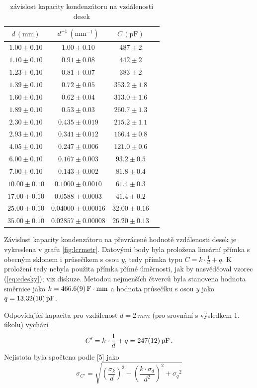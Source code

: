 \documentclass{../concepts/prepareprotokol} %
\begin{document}
\begin{table}[hbpt]
\centering
\caption{závislost kapacity kondenzátoru na vzdálenosti desek}
\begin{tabular}{cccc}
 \toprule
 $d\, (\mathrm{mm})$ & $d^{-1}\, (\mathrm{mm^{-1}})$ & $C\, (\mathrm{pF})$ \\
 \midrule
 $1.00 \pm 0.10$ & $1.00 \pm 0.10$ & $487 \pm 2$ \\
 $1.10 \pm 0.10$ & $0.91 \pm 0.08$ & $442 \pm 2$ \\
 $1.23 \pm 0.10$ & $0.81 \pm 0.07$ & $383 \pm 2$ \\
 $1.39 \pm 0.10$ & $0.72 \pm 0.05$ & $353.2 \pm 1.8$ \\
 $1.60 \pm 0.10$ & $0.62 \pm 0.04$ & $313.0 \pm 1.6$ \\
 $1.89 \pm 0.10$ & $0.53 \pm 0.03$ & $260.7 \pm 1.3$ \\
 $2.30 \pm 0.10$ & $0.435 \pm 0.019$ & $215.2 \pm 1.1$ \\
 $2.93 \pm 0.10$ & $0.341 \pm 0.012$ & $166.4 \pm 0.8$ \\
 $4.05 \pm 0.10$ & $0.247 \pm 0.006$ & $121.0 \pm 0.6$ \\
 $6.00 \pm 0.10$ & $0.167 \pm 0.003$ & $93.2 \pm 0.5$ \\
 $7.00 \pm 0.10$ & $0.143 \pm 0.002$ & $81.8 \pm 0.4$ \\
 $10.00 \pm 0.10$ & $0.1000 \pm 0.0010$ & $61.4 \pm 0.3$ \\
 $17.00 \pm 0.10$ & $0.0588 \pm 0.0003$ & $41.4 \pm 0.2$ \\
 $25.00 \pm 0.10$ & $0.04000 \pm 0.00016$ & $32.00 \pm 0.16$ \\
 $35.00 \pm 0.10$ & $0.02857 \pm 0.00008$ & $26.20 \pm 0.13$ \\
 \bottomrule
\end{tabular}
\label{tab:lcrmetr}
\end{table}

Závislost kapacity kondenzátoru na převrácené hodnotě vzdálenosti desek je vykreslena v grafu \ref{fig:lcrmetr}. Datovými body byla proložena lineární přímka s obecným sklonem i průsečíkem s osou $y$, tedy přímka typu $C = k \cdot \frac{1}{d} + q$. K proložení tedy nebyla použita přímka přímé úměrnosti, jak by nasvědčoval vzorec (\ref{eq:cdesky}); viz diskuze. Metodou nejmenších čtverců byla stanovena hodnota směrnice jako $k = \SI{466.6 \pm 0.9}{F \cdot \milli\meter}$ a hodnota průsečíku s osou $y$ jako $q = \SI{13.32 \pm 0.10}{pF}$.

Odpovídající kapacita pro vzdálenost $d = \SI{2}{mm}$ (pro srovnání s výsledkem 1. úkolu) vychází
\begin{equation} \label{eq:cfromkq}
    C' = k \cdot \frac{1}{d} + q = \SI{247 \pm 12}{pF} \, .
\end{equation}
Nejistota byla spočtena podle [5] jako
\begin{equation}
    \sigma_{C'} = \sqrt{\left(\frac{\sigma_k}{d}\right)^2 + 
    \left(\frac{k \cdot \sigma_d}{d^2}\right)^2 + {\sigma_q}^2}
\end{equation}
\end{document}
